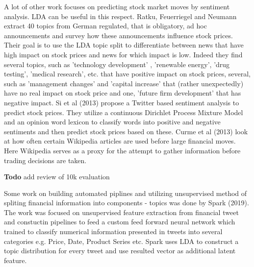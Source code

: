 \documentclass[12pt,journal,letterpaper,oneside,onecolumn]{IEEEtran}
\begin{document}
A lot of other work focuses on predicting stock market moves by sentiment
analysis. LDA can be useful in this respect.
Ratku, Feuerriegel and Neumann extract 40 topics from German regulated, that is obligatory, ad hoc
announcements and survey how these announcements influence stock prices. Their goal
is to use the LDA topic split to differentiate between news that have high impact on
stock prices and news for which impact is low. Indeed they find several topics, such
as 'technology development' , 'renewable energy', 'drug testing', 'medical research',
etc. that have positive impact on stock prices, several, such as 'management changes'
and 'capital increase' that (rather unexpectedly) have no real impact on stock price and
one, 'future firm development' that has negative impact.
Si et al (2013) propose a Twitter based sentiment analysis to predict stock
prices. They utilize a continuous Dirichlet Process Mixture Model and an opinion
word lexicon to classify words into positive and negative sentiments and then predict
stock prices based on these.
Curme et al (2013) look at how often certain Wikipedia articles are used before large
financial moves. Here Wikipedia serves as a proxy for the attempt to gather
information before trading decisions are taken.

\textbf{Todo} add review of 10k evaluation

Some work on building automated piplines and utilizing unsupervised method of spliting financial information into components - topics was done by Spark (2019)\cite{ref_finnum_spark}. The work was focused on unsupervised feature extraction from financial tweet and constuctin pipelines to feed a custom feed forward neural network which trained to classify numerical information presented in tweets into several categories e.g. Price, Date, Product Series etc. Spark uses LDA to construct a topic distribution for every tweet and use resulted vector as additional latent feature.
\end{document}
